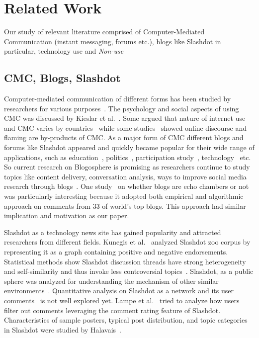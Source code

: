 \section{Related Work}
\label{sec:relatedwork}
Our study of relevant literature comprised of Computer-Mediated Communication (instant messaging, forums etc.), blogs like Slashdot in particular, technology use and \emph{Non-use} 

\subsection{CMC, Blogs, Slashdot}
Computer-mediated communication of different forms has been studied by researchers for various purposes~\cite{ackerman1996answer}. The psychology and social aspects of using CMC was discussed by Kieslar et al.~\cite{kiesler1984social}. Some argued that nature of internet use and CMC varies by countries~\cite{wellman2003social} while some studies~\cite{lange2006your} showed online discourse and flaming are by-products of CMC. As a major form of CMC different blogs and forums like Slashdot appeared and quickly became popular for their wide range of applications, such as education~\cite{duffy2006use, pinkman2005using,  williams2004exploring}, politics~\cite{davis2009typing, koop2009political}, participation study~\cite{gaonkar2008micro}, technology~\cite{khabiri2009analyzing} etc. So current research on Blogosphere is promising as researchers continue to study topics like content delivery, conversation analysis, ways to improve social media research through blogs~\cite{ferdig2004content, herring2005conversations, hookway2008entering}. One study~\cite{gilbert2009blogs} on whether blogs are echo chambers or not was particularly interesting because it adopted both empirical and algorithmic approach on comments from 33 of world's top blogs. This approach had similar implication and motivation as our paper.

Slashdot as a technology news site has gained popularity and attracted researchers from different fields. Kunegis et al.~\cite{kunegis2009slashdot} analyzed Slashdot zoo corpus by representing it as a graph containing positive and negative endorsements. Statistical methods show Slashdot discussion threads have strong heterogeneity and self-similarity and thus invoke less controversial topics~\cite{gomez2008statistical}. Slashdot, as a public sphere was analyzed for understanding the mechanism of other similar environments~\cite{baoill2000slashdot, poor2005mechanisms}. Quantitative analysis on Slashdot as a network and its user comments~\cite{gomez2008statistical, kaltenbrunner2007description} is not well explored yet. Lampe et al.~\cite{lampe2007follow} tried to analyze how users filter out comments leveraging the comment rating feature of Slashdot. Characteristics of sample posters, typical post distribution, and topic categories in Slashdot were studied by Halavais~\cite{halavais2001slashdot}.


